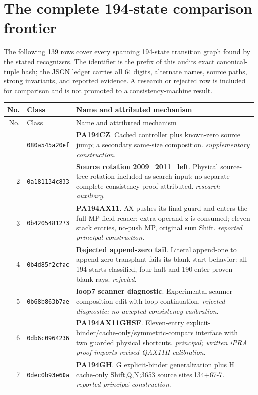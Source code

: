\section{The complete 194-state comparison frontier}
\label{sec:frontier}
The following 139 rows cover every spanning 194-state transition graph found by the stated recognizers. The identifier is the prefix of this audit\textquotesingle s exact canonical-tuple hash; the JSON ledger carries all 64 digits, alternate names, source paths, strong invariants, and reported evidence. A research or rejected row is included for comparison and is not promoted to a consistency-machine result.
\small
\begin{longtable}{@{}r p{} p{}@{}}
\toprule No. & Class & Name and attributed mechanism\\\midrule\endfirsthead
\toprule No. & Class & Name and attributed mechanism\\\midrule\endhead
\bottomrule\endfoot
1 & \texttt{080a545a20ef} & \textbf{PA194CZ}. Cached controller plus known-zero source jump; a secondary same-size composition. \emph{supplementary construction}.\\[3pt]
2 & \texttt{0a181134c833} & \textbf{Source rotation 2009\_2011\_left}. Physical source-tree rotation included as search input; no separate complete consistency proof attributed. \emph{research auxiliary}.\\[3pt]
3 & \texttt{0b4205481273} & \textbf{PA194AX11}. AX pushes its final guard and enters the full MP field reader; extra operand z is consumed; eleven stack entries, no-push MP, original sum Shift. \emph{reported principal construction}.\\[3pt]
4 & \texttt{0b4d85f2cfac} & \textbf{Rejected append-zero tail}. Literal append-one to append-zero transplant fails its blank-start behavior: all 194 starts classified, four halt and 190 enter proven blank rays. \emph{rejected}.\\[3pt]
5 & \texttt{0b68b863b7ae} & \textbf{loop7 scanner diagnostic}. Experimental scanner-composition edit with loop continuation. \emph{rejected diagnostic; no accepted consistency calibration}.\\[3pt]
6 & \texttt{0db6c0964236} & \textbf{PA194AX11GHSF}. Eleven-entry explicit-binder/cache-only/symmetric-compare interface with two guarded physical shortcuts. \emph{principal; written iPRA proof imports revised QAX11H calibration}.\\[3pt]
7 & \texttt{0dec0b93e60a} & \textbf{PA194GH}. G explicit-binder generalization plus H cache-only Shift,Q,N;3653 source sites,134+67-7. \emph{reported principal construction}.\\[3pt]

\end{longtable}
